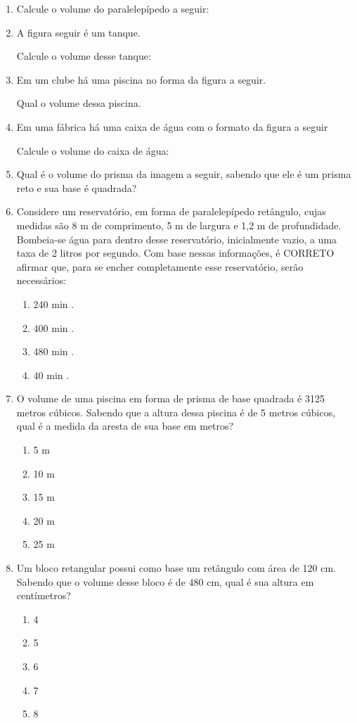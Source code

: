 \documentclass[twocolumn,oneside,a4paper,12pt]{article}
\begin{document}
\begin{enumerate}
\item Calcule o volume do paralelepípedo a seguir:

\item A figura seguir é um tanque.

Calcule o volume desse tanque:

\item Em um clube há uma piscina no forma da figura a seguir.

Qual o volume dessa piscina.

\item Em uma fábrica há uma caixa de água com o formato da figura a seguir

Calcule o volume do caixa de água:

\item Qual é o volume do prisma da imagem a seguir, sabendo que ele é um prisma reto e sua base é quadrada?

\item Considere um reservatório, em forma de paralelepípedo retângulo, cujas medidas são 8 m de comprimento, 5 m de largura e 1,2 m de profundidade. Bombeia-se água para dentro desse reservatório, inicialmente vazio, a uma taxa de 2 litros por segundo. Com base nessas informações, é CORRETO afirmar que, para se encher completamente esse reservatório, serão necessários:
\begin{enumerate}
\item 240 min .
\item 400 min .
\item 480 min .
\item 40 min .
\end{enumerate}

\item O volume de uma piscina em forma de prisma de base quadrada é 3125 metros cúbicos. Sabendo que a altura dessa piscina é de 5 metros cúbicos, qual é a medida da aresta de sua base em metros?
\begin{enumerate}
\item 5 m
\item 10 m
\item 15 m
\item 20 m
\item 25 m
\end{enumerate}

\item Um bloco retangular possui como base um retângulo com área de 120 cm. Sabendo que o volume desse bloco é de 480 cm, qual é sua altura em centímetros?
\begin{enumerate}
\item 4
\item 5
\item 6
\item 7
\item 8
\end{enumerate}


\end{enumerate}
\end{document}
